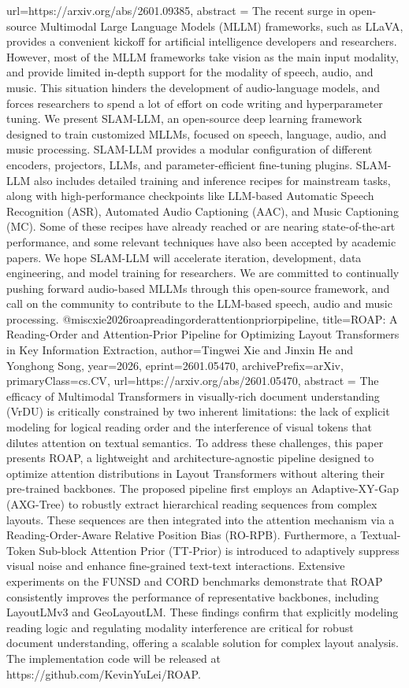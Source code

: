 {      url={https://arxiv.org/abs/2601.09385},
      abstract = {The recent surge in open-source Multimodal Large Language Models (MLLM) frameworks, such as LLaVA, provides a convenient kickoff for artificial intelligence developers and researchers. However, most of the MLLM frameworks take vision as the main input modality, and provide limited in-depth support for the modality of speech, audio, and music. This situation hinders the development of audio-language models, and forces researchers to spend a lot of effort on code writing and hyperparameter tuning. We present SLAM-LLM, an open-source deep learning framework designed to train customized MLLMs, focused on speech, language, audio, and music processing. SLAM-LLM provides a modular configuration of different encoders, projectors, LLMs, and parameter-efficient fine-tuning plugins. SLAM-LLM also includes detailed training and inference recipes for mainstream tasks, along with high-performance checkpoints like LLM-based Automatic Speech Recognition (ASR), Automated Audio Captioning (AAC), and Music Captioning (MC). Some of these recipes have already reached or are nearing state-of-the-art performance, and some relevant techniques have also been accepted by academic papers. We hope SLAM-LLM will accelerate iteration, development, data engineering, and model training for researchers. We are committed to continually pushing forward audio-based MLLMs through this open-source framework, and call on the community to contribute to the LLM-based speech, audio and music processing.}
}@misc{xie2026roapreadingorderattentionpriorpipeline,
      title={ROAP: A Reading-Order and Attention-Prior Pipeline for Optimizing Layout Transformers in Key Information Extraction}, 
      author={Tingwei Xie and Jinxin He and Yonghong Song},
      year={2026},
      eprint={2601.05470},
      archivePrefix={arXiv},
      primaryClass={cs.CV},
      url={https://arxiv.org/abs/2601.05470},
      abstract = {The efficacy of Multimodal Transformers in visually-rich document understanding (VrDU) is critically constrained by two inherent limitations: the lack of explicit modeling for logical reading order and the interference of visual tokens that dilutes attention on textual semantics.   To address these challenges, this paper presents ROAP, a lightweight and architecture-agnostic pipeline designed to optimize attention distributions in Layout Transformers without altering their pre-trained backbones.   The proposed pipeline first employs an Adaptive-XY-Gap (AXG-Tree) to robustly extract hierarchical reading sequences from complex layouts. These sequences are then integrated into the attention mechanism via a Reading-Order-Aware Relative Position Bias (RO-RPB). Furthermore, a Textual-Token Sub-block Attention Prior (TT-Prior) is introduced to adaptively suppress visual noise and enhance fine-grained text-text interactions.   Extensive experiments on the FUNSD and CORD benchmarks demonstrate that ROAP consistently improves the performance of representative backbones, including LayoutLMv3 and GeoLayoutLM.   These findings confirm that explicitly modeling reading logic and regulating modality interference are critical for robust document understanding, offering a scalable solution for complex layout analysis. The implementation code will be released at https://github.com/KevinYuLei/ROAP.}
}
